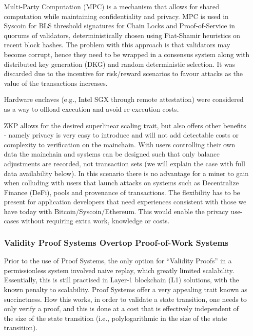\documentclass[peerreview]{ieeesyscoin}
\begin{document}
Multi-Party Computation (MPC) is a mechanism that allows for shared computation while maintaining confidentiality and privacy. MPC is used in Syscoin for BLS threshold signatures for Chain Locks and Proof-of-Service in quorums of validators, deterministically chosen using Fiat-Shamir heuristics on recent block hashes. The problem with this approach is that validators may become corrupt, hence they need to be wrapped in a consensus system along with distributed key generation (DKG) and random deterministic selection. It was discarded due to the incentive for risk/reward scenarios to favour attacks as the value of the transactions increases.

Hardware enclaves (e.g., Intel SGX through remote attestation) were considered as a way to offload execution and avoid re-execution costs. 

ZKP allows for the desired superlinear scaling trait, but also offers other benefits - namely privacy is very easy to introduce and will not add detectable costs or complexity to verification on the mainchain. With users controlling their own data the mainchain and systems can be designed such that only balance adjustments are recorded, not transaction sets (we will explain the case with full data availability below). In this scenario there is no advantage for a miner to gain when colluding with users that launch attacks on systems such as Decentralize Finance (DeFi), pools and provenance of transactions. The flexibility has to be present for application developers that need experiences consistent with those we have today with Bitcoin/Syscoin/Ethereum. This would enable the privacy use-cases without requiring extra work, knowledge or costs.


\subsubsection{Validity Proof Systems Overtop Proof-of-Work Systems}

Prior to the use of Proof Systems, the only option for “Validity Proofs” in a permissionless system involved naive replay, which greatly limited scalability. Essentially, this is still practised in Layer-1 blockchain (L1) solutions, with the known penalty to scalability. Proof Systems offer a very appealing trait known as succinctness. How this works, in order to validate a state transition, one needs to only verify a proof, and this is done at a cost that is effectively independent of the size of the state transition (i.e., polylogarithmic in the size of the state transition).
\end{document}
